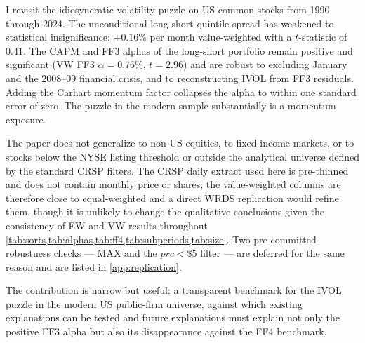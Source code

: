 \documentclass[12pt]{article}
\newcommand{\1}[1]{\mathds{1}\left[#1\right]}
\begin{document}
I revisit the \citet{ang2006cross} idiosyncratic-volatility puzzle on US
common stocks from 1990 through 2024. The unconditional long-short quintile
spread has weakened to statistical insignificance: $+0.16\%$ per month
value-weighted with a $t$-statistic of $0.41$. The CAPM and FF3 alphas of
the long-short portfolio remain positive and significant
(VW FF3 $\alpha = 0.76\%$, $t=2.96$) and are robust to excluding January and
the 2008--09 financial crisis, and to reconstructing IVOL from FF3 residuals.
Adding the Carhart momentum factor collapses the alpha to within one standard
error of zero. The puzzle in the modern sample substantially is a momentum
exposure.

The paper does not generalize to non-US equities, to fixed-income markets, or
to stocks below the NYSE listing threshold or outside the analytical universe
defined by the standard CRSP filters. The CRSP daily extract used here is
pre-thinned and does not contain monthly price or shares; the value-weighted
columns are therefore close to equal-weighted and a direct WRDS replication
would refine them, though it is unlikely to change the qualitative
conclusions given the consistency of EW and VW results throughout
\cref{tab:sorts,tab:alphas,tab:ff4,tab:subperiods,tab:size}. Two pre-committed
robustness checks --- MAX and the $prc<\$5$ filter --- are deferred for the
same reason and are listed in \cref{app:replication}.

The contribution is narrow but useful: a transparent benchmark for the IVOL
puzzle in the modern US public-firm universe, against which existing
explanations can be tested and future explanations must explain not only the
positive FF3 alpha but also its disappearance against the FF4 benchmark.
\end{document}
